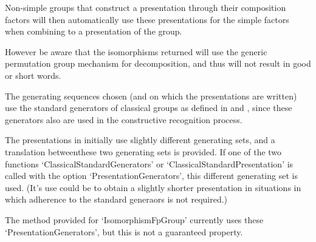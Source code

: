 Non-simple groups that construct a presentation through their composition
factors will then automatically use these presentations for the simple
factors when combining to a presentation of the group.

However be aware that the isomorphisms returned will use the generic
permutation group mechanism for decomposition, and thus will not result in
good or short words.


The generating sequences chosen (and on which the presentations are written)
use the standard generators of classical groups as defined in
\cite{LGO09} and \cite{DLLGO13}, since these generators also are used in the
constructive recognition process.

The presentations in \cite{LGO20} initially use slightly different generating
sets, and a translation betweenthese two generating sets is provided. If one
of the two functions `ClassicalStandardGenerators' or
`ClassicalStandardPresentation' is called with the option
`PresentationGenerators', this different generating set is used. (It's use
could be to obtain a slightly shorter presentation in situations in which
adherence to the standard generaors is not required.)

The method provided for `IsomorphismFpGroup' currently uses these
`PresentationGenerators', but this is not a guaranteed property.


